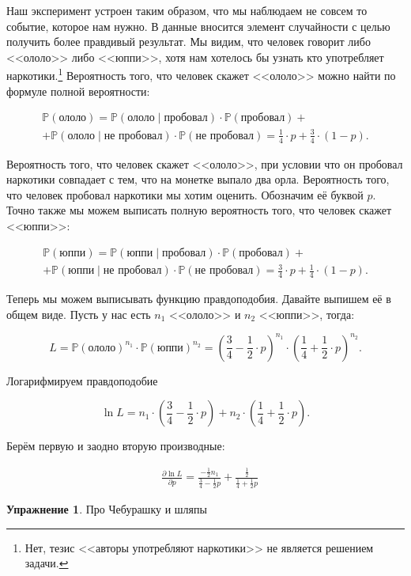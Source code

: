 \documentclass[12pt, a4paper, oneside]{extreport}
\def \mbb{\mathbb}
\def \PP{\mbb{P}}
\theoremstyle{plain}              %
\theoremstyle{definition}         %
\newtheorem{problem}{\color{myblue} Упражнение}
\begin{document}
\begin{sol} 
	Наш эксперимент устроен таким образом, что мы наблюдаем не совсем то событие, которое нам нужно. В данные вносится элемент случайности с целью получить более правдивый результат. Мы видим, что человек говорит либо <<ололо>> либо <<юппи>>, хотя нам хотелось бы узнать кто употребляет наркотики.\footnote{Нет, тезис <<авторы употребляют наркотики>> не является решением задачи.} Вероятность того, что человек скажет <<ололо>> можно найти по формуле полной вероятности: 
	
	\begin{multline*}
	\PP(\text{ололо}) = \PP(\text{ололо} \mid \text{пробовал}) \cdot \PP(\text{пробовал}) + \\ + \PP(\text{ололо} \mid \text{не пробовал}) \cdot \PP(\text{не пробовал}) = \frac{1}{4} \cdot p + \frac{3}{4} \cdot (1-p).
	\end{multline*}
	
	Вероятность того, что человек скажет <<ололо>>, при условии что он пробовал наркотики совпадает с тем, что на монетке выпало два орла. Вероятность того, что человек пробовал наркотики мы хотим оценить. Обозначим её буквой $p$.  Точно также мы можем выписать полную вероятность того, что человек скажет <<юппи>>: 
	
	\begin{multline*}
	\PP(\text{юппи}) = \PP(\text{юппи} \mid \text{пробовал}) \cdot \PP(\text{пробовал}) + \\ + \PP(\text{юппи} \mid \text{не пробовал}) \cdot \PP(\text{не пробовал}) = \frac{3}{4} \cdot p + \frac{1}{4} \cdot (1-p).
	\end{multline*}
	
	Теперь мы можем выписывать функцию правдоподобия. Давайте выпишем её в общем виде. Пусть у нас есть $n_1$ <<ололо>> и $n_2$ <<юппи>>, тогда:
	
	\[
	L = \PP(\text{ололо})^{n_1} \cdot  \PP(\text{юппи})^{n_2} = \left( \frac{3}{4} - \frac{1}{2} \cdot p \right)^{n_1} \cdot \left( \frac{1}{4} + \frac{1}{2} \cdot p \right)^{n_2}.
	\]
	
	Логарифмируем правдоподобие 
	
	\[
	\ln L = n_1 \cdot \left( \frac{3}{4} - \frac{1}{2} \cdot p \right) + n_2 \cdot  \left( \frac{1}{4} + \frac{1}{2} \cdot p \right).
	\]

	Берём первую и заодно вторую производные: 
	
	\begin{equation*}
	\begin{aligned}
	&\frac{\partial \ln L}{\partial p} = \frac{ - \frac{1}{2} n_1}{\frac{3}{4} - \frac{1}{2} p} + \frac{\frac{1}{2}}{\frac{1}{4} + \frac{1}{2}p}
	
	\end{aligned}
	\end{equation*}
	
	
	
	
\end{sol} 





\begin{problem} 
	Про Чебурашку и шляпы 


	\begin{sol}

	\end{sol}
\end{problem}
\end{document}
